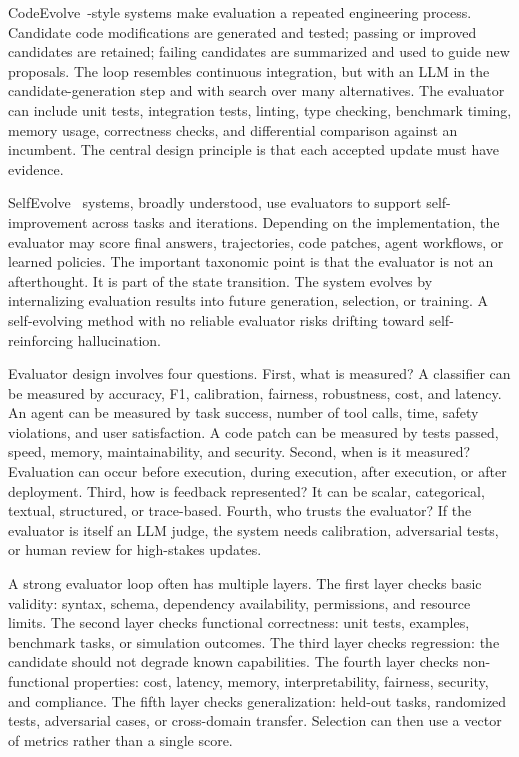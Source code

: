 CodeEvolve~\cite{codeevolve2024}-style systems make evaluation a repeated engineering process.  Candidate code modifications are generated and tested; passing or improved candidates are retained; failing candidates are summarized and used to guide new proposals.  The loop resembles continuous integration, but with an LLM in the candidate-generation step and with search over many alternatives.  The evaluator can include unit tests, integration tests, linting, type checking, benchmark timing, memory usage, correctness checks, and differential comparison against an incumbent.  The central design principle is that each accepted update must have evidence.

SelfEvolve~\cite{selfevolve2023} systems, broadly understood, use evaluators to support self-improvement across tasks and iterations.  Depending on the implementation, the evaluator may score final answers, trajectories, code patches, agent workflows, or learned policies.  The important taxonomic point is that the evaluator is not an afterthought.  It is part of the state transition.  The system evolves by internalizing evaluation results into future generation, selection, or training.  A self-evolving method with no reliable evaluator risks drifting toward self-reinforcing hallucination.

Evaluator design involves four questions.  First, what is measured?  A classifier can be measured by accuracy, F1, calibration, fairness, robustness, cost, and latency.  An agent can be measured by task success, number of tool calls, time, safety violations, and user satisfaction.  A code patch can be measured by tests passed, speed, memory, maintainability, and security.  Second, when is it measured?  Evaluation can occur before execution, during execution, after execution, or after deployment.  Third, how is feedback represented?  It can be scalar, categorical, textual, structured, or trace-based.  Fourth, who trusts the evaluator?  If the evaluator is itself an LLM judge, the system needs calibration, adversarial tests, or human review for high-stakes updates.

A strong evaluator loop often has multiple layers.  The first layer checks basic validity: syntax, schema, dependency availability, permissions, and resource limits.  The second layer checks functional correctness: unit tests, examples, benchmark tasks, or simulation outcomes.  The third layer checks regression: the candidate should not degrade known capabilities.  The fourth layer checks non-functional properties: cost, latency, memory, interpretability, fairness, security, and compliance.  The fifth layer checks generalization: held-out tasks, randomized tests, adversarial cases, or cross-domain transfer.  Selection can then use a vector of metrics rather than a single score.

